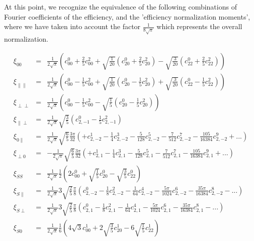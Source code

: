 \documentclass[a4paper,9pt,twosided]{article}
\begin{document}
At this point, we recognize the equivalence of the following combinations of Fourier coefficients of the efficiency, and the 'efficiency normalization moments', where we have taken into account the factor $\frac{1}{8\sqrt{\pi}}$ which represents the overall normalization. 

\begin{eqnarray}
    \xi_{00}                 &=& \frac{1}{2\sqrt{\pi}} \left( c^0_{00}+\frac{2}{5}c^2_{00}+\sqrt{\frac{1}{20}}(c^0_{20}+\frac{2}{5}c^2_{20})-\sqrt{\frac{3}{20}}(c^0_{22}+\frac{2}{5}c^2_{22}) \right) \\
    \xi_{\parallel\parallel} &=& \frac{1}{2\sqrt{\pi}} \left( c^0_{00}-\frac{1}{5}c^2_{00}+\sqrt{\frac{1}{20}}\left(c^0_{20}-\frac{1}{5}c^2_{20}\right)+\sqrt{\frac{3}{20}}\left(c^0_{22}-\frac{1}{5}c^2_{22}\right)  \right)  \\
    \xi_{\perp\perp}         &=& \frac{1}{2\sqrt{\pi}} \left( c^0_{00}-\frac{1}{5}c^2_{00} - \sqrt{\frac{1}{5}}\left(c^0_{20}-\frac{1}{5}c^2_{20}\right)\right)\\
    \xi_{\parallel\perp}     &=& \frac{1}{2\sqrt{\pi}} \sqrt{\frac{3}{5}}\left(c^0_{2,-1}-\frac{1}{5}c^2_{2,-1}\right)  \\
    \xi_{0\parallel}         &=& \frac{1}{2\sqrt{\pi}} \sqrt{\frac{6}{5}}\frac{3\pi}{32}\left( +c^1_{2,-2}-\frac{1}{4}c^3_{2,-2}-\frac{5}{128}c^5_{2,-2}-\frac{7}{512}c^7_{2,-2} - \frac{105}{16384}c^9_{2,-2}+... \right) \\
    \xi_{\perp 0}            &=& -\frac{1}{2\sqrt{\pi}} \sqrt{\frac{6}{5}}\frac{3\pi}{32}\left( +c^1_{2,1} -\frac{1}{4}c^3_{2,1}- \frac{5}{128}c^5_{2,1} -\frac{7}{512}c^7_{2,1} - \frac{105}{16384}c^9_{2,1}+... \right) \\
    \xi_{SS}               &=&  \frac{1}{2\sqrt{\pi}}\frac{1}{2} \left(2c^0_{00} + \sqrt{\frac{1}{5}}c^0_{20} -\sqrt{\frac{3}{5}} c^0_{22}\right) \\
    \xi_{S \parallel}        &=&  \frac{1}{2\sqrt{\pi}} 3 \sqrt{\frac{2}{5}}\frac{\pi}{8} \left(c^0_{2,-2}-\frac{1}{8}c^2_{2,-2}-\frac{1}{64}c^4_{2,-2}-\frac{5\pi}{1024}c^6_{2,-2}-\frac{35\pi}{16384}c^8_{2,-2}-...\right)\\
    \xi_{S \perp}           &=& \frac{1}{2\sqrt{\pi}} 3\sqrt{\frac{2}{5}} \frac{\pi}{8} \left(c^0_{2,1}-\frac{1}{8}c^2_{2,1}-\frac{1}{64}c^4_{2,1}-\frac{5\pi}{1024}c^6_{2,1}-\frac{35\pi}{16384}c^8_{2,1}-...\right)\\
    \xi_{S 0}              &=& \frac{1}{2\sqrt{\pi}}\frac{1}{6}\left(4\sqrt{3}  c^1_{00} + 2 \sqrt{\frac{3}{5}} c^1_{20} - 6 \sqrt{\frac{1}{5}}c^1_{22}\right)
    \end{eqnarray}
\end{document}
